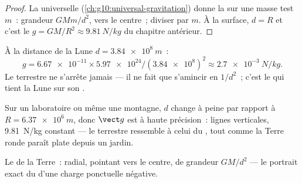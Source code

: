 \begin{proof}
La  universelle
(\cref{ch:g10:universal-gravitation}) donne la
 sur une masse test $m$~: grandeur
$G M m / d^2$, vers le centre~; diviser par $m$. À la surface,
$d = R$ et c'est le $g = GM/R^2 \approx \qty{9.81}{N/kg}$ du chapitre
antérieur.
\end{proof}

\begin{example}\label{ex:g11:electric-gravitational-fields:moon}
À la distance de la Lune $d = \qty{3.84e8}{m}$~:
\[
g = \num{6.67e-11} \times \num{5.97e24} / (\num{3.84e8})^2
\approx \qty{2.7e-3}{N/kg}.
\]
Le  terrestre ne s'arrête
jamais --- il ne fait que s'amincir en $1/d^2$~; c'est le
 qui tient la Lune sur son
.
\end{example}

\begin{remark}\label{rem:g11:electric-gravitational-fields:uniformg}
Sur un laboratoire ou même une montagne, $d$ change à peine par rapport
à $R = \qty{6.37e6}{m}$, donc $\vect g$ est
 à haute précision~: lignes
verticales, \qty{9.81}{N/kg} constant --- le
 terrestre ressemble à celui du
, tout comme la Terre
ronde paraît plate depuis un jardin.
\end{remark}

\begin{omfigure}

{\small Le  de la
Terre~: radial, pointant vers le centre, de grandeur $GM/d^2$ --- le
portrait exact du  d'une charge
ponctuelle négative.}
\end{omfigure}

